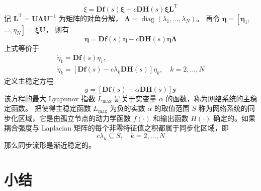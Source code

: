 \begin{equation}
    \dot{\xi}=\boldsymbol{D} \boldsymbol{f}(s) \boldsymbol{\xi}-c \boldsymbol{D} \boldsymbol{H}(s) \boldsymbol{\xi} \boldsymbol{L}^{\mathrm{T}}
\end{equation}
记 $\boldsymbol{L}^{\mathrm{T}}=\boldsymbol{U} \boldsymbol{\Lambda} \boldsymbol{U}^{-1}$ 为矩阵的对角分解，
$\boldsymbol{\Lambda}=\operatorname{diag}\left(\lambda_1, \ldots, \lambda_N\right)$。 
再令 $\boldsymbol{\eta}=\left[\boldsymbol{\eta}_1\right.$, $\left.\ldots, \eta_N\right]=\boldsymbol{\xi U}$， 则有
\begin{equation}
    \dot{\boldsymbol{\eta}}=\boldsymbol{D} \boldsymbol{f}(s) \boldsymbol{\eta}-c \boldsymbol{D} \boldsymbol{H}(s) \boldsymbol{\eta} \mathbf{\Lambda}
\end{equation}
上式等价于
\begin{equation}
    \begin{gathered}
    \dot{\eta}_1=\boldsymbol{D} \boldsymbol{f}(s) \eta_1, \\
    \dot{\eta}_k=\left[\boldsymbol{D} \boldsymbol{f}(s)-c \lambda_k \boldsymbol{D} \boldsymbol{H}(s)\right] \eta_k, \quad k=2, \ldots, N
    \end{gathered}
\end{equation}
定义主稳定方程
\begin{equation}
    \dot{y}=[\boldsymbol{D} \boldsymbol{f}(s)-\alpha \boldsymbol{D} \boldsymbol{H}(s)] \boldsymbol{y}
\end{equation}
该方程的最大 Lyapunov 指数 $L_{\max }$ 是关于实变量 $\alpha$ 的函数，称为网络系统的主稳定函数。
把使得主稳定函数 $L_{\max }$ 为负的实数 $\alpha$ 的取值范围 $S$ 称为网络系统的同步化区域，它是由孤立节点的动力学函数 $f(\cdot)$ 和输出函数
$H(\cdot)$ 确定的。如果耦合强度与 Laplacian 矩阵的每个非零特征值之积都属于同步化区域，即
\begin{equation}
    c \lambda_k \subseteq S, \quad k=2, \ldots, N
\end{equation}
那么同步流形是渐近稳定的。


\section{小结}